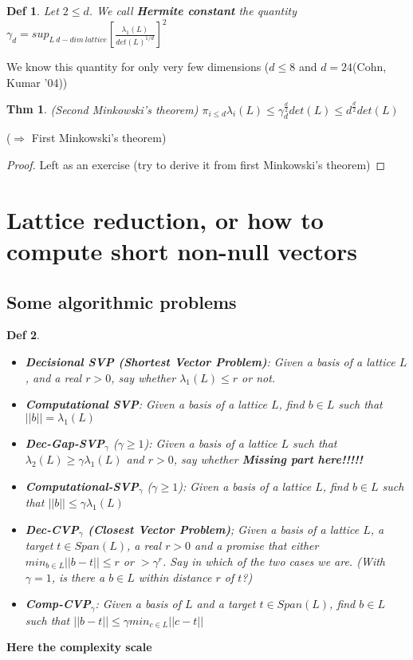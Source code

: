 \documentclass[11pt]{article}
\newtheorem{definition}{Def}
\newtheorem{theorem}{Thm}
\begin{document}
\begin{definition}
Let $2 \leq d$. We call \textbf{Hermite constant} the quantity $\gamma_d = sup_{L \ d-dim \ lattice} [\frac{\lambda_1 (L)}{det(L)^{1/d}}]^2$
\end{definition}

We know this quantity for only very few dimensions ($d \leq 8$ and $d=24$(Cohn, Kumar '04))

\begin{theorem} (Second Minkowski's theorem)
$\pi_{i \leq d} \lambda_i(L) \leq \gamma_d^{\frac{d}{2}} det(L) \leq d^{\frac{d}{2}} det(L)$
\end{theorem}

($\Rightarrow$ First Minkowski's theorem)

\begin{proof}
Left as an exercise (try to derive it from first Minkowski's theorem)
\end{proof}

\section{Lattice reduction, or how to compute short non-null vectors}

\subsection{Some algorithmic problems}

\begin{definition}
\begin{itemize}
\item \textbf{Decisional SVP (Shortest Vector Problem)}: Given a basis of a lattice $L$, and a real $r>0$, say whether $\lambda_1(L) \leq r$ or not.
\item \textbf{Computational SVP}: Given a basis of a lattice $L$, find $b \in L$ such that $||b||=\lambda_1(L)$
\item \textbf{Dec-Gap-SVP$_{\gamma}$} ($\gamma \geq 1$): Given a basis of a lattice $L$ such that $\lambda_2(L) \geq \gamma \lambda_1(L)$ and $r>0$, say whether \textbf{Missing part here!!!!!}
\item \textbf{Computational-SVP$_{\gamma}$} ($\gamma \geq 1$): Given a basis of a lattice $L$, find $b \in L$ such that $||b|| \leq \gamma \lambda_1(L)$
\item \textbf{Dec-CVP$_{\gamma}$ (Closest Vector Problem)}; Given a basis of a lattice $L$, a target $t \in Span(L)$, a real $r>0$ and a promise that either $min_{b \in L} ||b-t|| \leq r$ or $> \gamma^r$. Say in which of the two cases we are. (With $\gamma = 1$, is there a $b \in L$ within distance $r$ of $t$?)
\item \textbf{Comp-CVP$_{\gamma}$}: Given a basis of $L$ and a target $t \in Span(L)$, find $b \in L$ such that $||b-t|| \leq \gamma min_{c \in L} ||c-t||$
\end{itemize}
\end{definition}
\textbf{Here the complexity scale}
\end{document}
